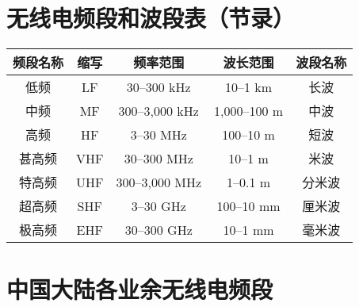 \newpage

\section{无线电频段和波段表（节录）}

\begin{tabular}{|c|c|c|c|c|}
  \hline
  \textbf{频段名称} & \textbf{缩写} & \textbf{频率范围}       & \textbf{波长范围} & \textbf{波段名称} \\
  \hline
  低频            & LF          & 30–300 \si{\kHz}    & 10–1 km       & 长波            \\
  \hline
  中频            & MF          & 300–3,000 \si{\kHz} & 1,000–100 m   & 中波            \\
  \hline
  高频            & HF          & 3–30 \si{\MHz}      & 100–10 m      & 短波            \\
  \hline
  甚高频           & VHF         & 30–300 \si{\MHz}    & 10–1 m        & 米波            \\
  \hline
  特高频           & UHF         & 300–3,000 \si{\MHz} & 1–0.1 m       & 分米波           \\
  \hline
  超高频           & SHF         & 3–30 \si{\GHz}      & 100–10 mm     & 厘米波           \\
  \hline
  极高频           & EHF         & 30–300 \si{\GHz}    & 10–1 mm       & 毫米波           \\
  \hline
\end{tabular}

\newpage

\section{中国大陆各业余无线电频段}

